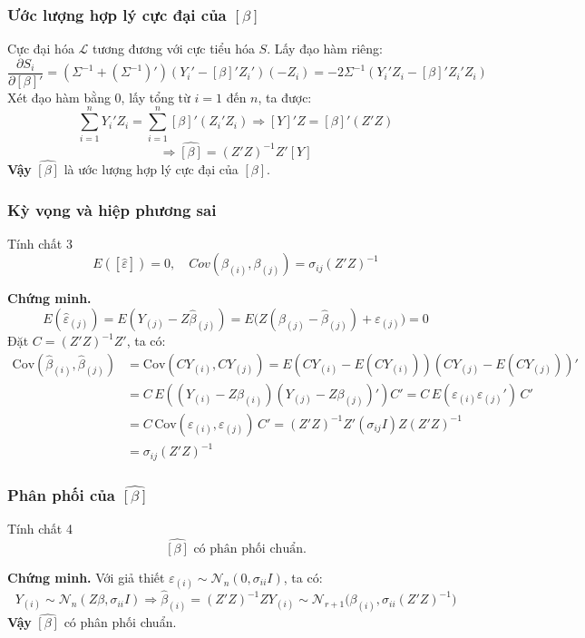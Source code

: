 \begin{frame}
\frametitle{Ước lượng hợp lý cực đại của $[\beta]$}
Cực đại hóa $\mathcal{L}$ tương đương với cực tiểu hóa $S$.  
Lấy đạo hàm riêng:
\[
\frac{\partial S_i}{\partial [\beta]'}
= (\Sigma^{-1} + (\Sigma^{-1})')(Y_i' - [\beta]'Z_i')(-Z_i)
= -2\Sigma^{-1}(Y_i'Z_i - [\beta]'Z_i'Z_i)
\]
Xét đạo hàm bằng 0, lấy tổng từ $i=1$ đến $n$, ta được:
\[
\sum_{i=1}^{n}Y_i'Z_i = \sum_{i=1}^{n}[\beta]'(Z_i'Z_i)
\Rightarrow [Y]'Z = [\beta]'(Z'Z)
\]
\[
\boxed{\Rightarrow\widehat{[\beta]} = (Z'Z)^{-1}Z'[Y]}
\]
\textbf{Vậy } $\widehat{[\beta]}$ là ước lượng hợp lý cực đại của $[\beta]$.
\end{frame}

\begin{frame}
\frametitle{Kỳ vọng và hiệp phương sai}
\begin{block}{Tính chất 3}
\[
E([\widehat{\varepsilon}]) = 0, 
\quad
Cov(\beta_{(i)}, \beta_{(j)}) = \sigma_{ij}(Z'Z)^{-1}
\]
\end{block}
\textbf{Chứng minh.}
\[
E(\widehat{\varepsilon}_{(j)})
= E(Y_{(j)} - Z\widehat{\beta}_{(j)})
= E\big(Z(\beta_{(j)} - \widehat{\beta}_{(j)}) + \varepsilon_{(j)}\big)
= 0
\]
Đặt $C = (Z'Z)^{-1}Z'$, ta có:
\[
\begin{aligned}
\mathrm{Cov}(\widehat{\beta}_{(i)}, \widehat{\beta}_{(j)})
&= \mathrm{Cov}(CY_{(i)}, CY_{(j)})
= E\!\left(CY_{(i)} - E(CY_{(i)})\right)\!\left(CY_{(j)} - E(CY_{(j)})\right)' \\
&= C\,E\!\left((Y_{(i)} - Z\beta_{(i)})(Y_{(j)} - Z\beta_{(j)})'\right)C'
= C\,E(\varepsilon_{(i)}\varepsilon_{(j)}')\,C' \\
&= C\,\mathrm{Cov}(\varepsilon_{(i)}, \varepsilon_{(j)})\,C' = (Z'Z)^{-1}Z'(\sigma_{ij}I)Z(Z'Z)^{-1} \\
&= \sigma_{ij}(Z'Z)^{-1}
\end{aligned}
\]
\end{frame}

\begin{frame}
\frametitle{Phân phối của $\widehat{[\beta]}$}
\begin{block}{Tính chất 4}
\[
\boxed{
\widehat{[\beta]} \text{ có phân phối chuẩn.}
}
\]
\end{block}
\textbf{Chứng minh.}
Với giả thiết $\varepsilon_{(i)} \sim \mathcal{N}_n(0, \sigma_{ii}I)$, ta có:
\[
Y_{(i)} \sim \mathcal{N}_n(Z\beta, \sigma_{ii}I)
\Rightarrow 
\widehat{\beta}_{(i)} = (Z'Z)^{-1}ZY_{(i)} 
\sim \mathcal{N}_{r+1}\big(\beta_{(i)}, \sigma_{ii}(Z'Z)^{-1}\big)
\]
\textbf{Vậy } $\widehat{[\beta]}$ có phân phối chuẩn.
\end{frame}

